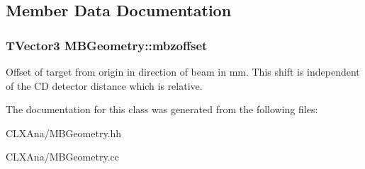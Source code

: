 \subsection{Member Data Documentation}
\hypertarget{class_m_b_geometry_a687268aeee7a0e2edc0486a76a07affe}{
\subsubsection[{mbzoffset}]{\setlength{\rightskip}{0pt plus 5cm}T\-Vector3 M\-B\-Geometry\-::mbzoffset\hspace{0.3cm}{\ttfamily [private]}}}\label{class_m_b_geometry_a687268aeee7a0e2edc0486a76a07affe}
Offset of target from origin in direction of beam in mm. This shift is independent of the C\-D detector distance which is relative. 

The documentation for this class was generated from the following files\-:\begin{DoxyCompactItemize}
\item 
C\-L\-X\-Ana/M\-B\-Geometry.\-hh\item 
C\-L\-X\-Ana/M\-B\-Geometry.\-cc\end{DoxyCompactItemize}

